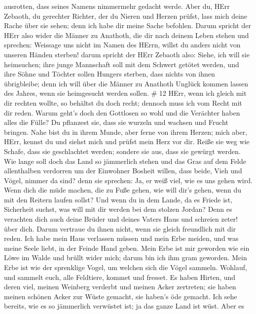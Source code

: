 ausrotten, dass seines Namens nimmermehr gedacht werde. 
Aber du, HErr Zebaoth, du gerechter Richter, der du Nieren und Herzen
prüfst, lass mich deine Rache über sie sehen; denn ich habe dir meine
Sache befohlen.  Darum spricht der HErr also wider die
Männer zu Anathoth, die dir nach deinem Leben stehen und sprechen:
Weissage uns nicht im Namen des HErrn, willst du anders nicht von
unseren Händen sterben!  darum spricht der HErr Zebaoth
also: Siehe, ich will sie heimsuchen; ihre junge Mannschaft soll mit dem
Schwert getötet werden, und ihre Söhne und Töchter sollen Hungers
sterben, dass nichts von ihnen übrigbleibe;  denn ich will
über die Männer zu Anathoth Unglück kommen lassen des Jahres, wenn sie
heimgesucht werden sollen. \# 12  HErr, wenn ich gleich mit
dir rechten wollte, so behältst du doch recht; dennoch muss ich vom
Recht mit dir reden. Warum geht's doch den Gottlosen so wohl und die
Verächter haben alles die Fülle?  Du pflanzest sie, dass sie
wurzeln und wachsen und Frucht bringen. Nahe bist du in ihrem Munde,
aber ferne von ihrem Herzen;  mich aber, HErr, kennst du und
siehst mich und prüfst mein Herz vor dir. Reiße sie weg wie Schafe, dass
sie geschlachtet werden; sondere sie aus, dass sie gewürgt werden.
 Wie lange soll doch das Land so jämmerlich stehen und das
Gras auf dem Felde allenthalben verdorren um der Einwohner Bosheit
willen, dass beide, Vieh und Vögel, nimmer da sind? denn sie sprechen:
Ja, er weiß viel, wie es uns gehen wird.  Wenn dich die müde
machen, die zu Fuße gehen, wie will dir's gehen, wenn du mit den Reitern
laufen sollst? Und wenn du in dem Lande, da es Friede ist, Sicherheit
suchst, was will mit dir werden bei dem stolzen Jordan? 
Denn es verachten dich auch deine Brüder und deines Vaters Haus und
schreien zeter! über dich. Darum vertraue du ihnen nicht, wenn sie
gleich freundlich mit dir reden.  Ich habe mein Haus
verlassen müssen und mein Erbe meiden, und was meine Seele liebt, in der
Feinde Hand geben.  Mein Erbe ist mir geworden wie ein Löwe
im Walde und brüllt wider mich; darum bin ich ihm gram geworden.
 Mein Erbe ist wie der sprenklige Vogel, um welchen sich die
Vögel sammeln. Wohlauf, und sammelt euch, alle Feldtiere, kommet und
fresset.  Es haben Hirten, und deren viel, meinen Weinberg
verderbt und meinen Acker zertreten; sie haben meinen schönen Acker zur
Wüste gemacht, sie haben's öde gemacht.  Ich sehe bereits,
wie es so jämmerlich verwüstet ist; ja das ganze Land ist wüst. Aber es
